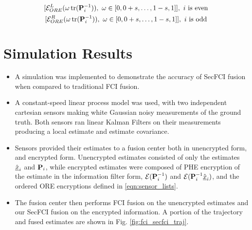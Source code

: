 \documentclass[letterpaper, 10 pt, conference]{ieeeconf}  %
\begin{document}
\begin{equation}
   \begin{gathered} \label{eqn:sensor_lists}
      [\mathcal{E}^L_{ORE}(\omega\tr(\mP^{-1}_i)),\ \omega \in [0,0+s,\dots,1-s,1]],\ i\text{ is even} \\
      [\mathcal{E}^R_{ORE}(\omega\tr(\mP^{-1}_i)),\ \omega \in [0,0+s,\dots,1-s,1]],\ i\text{ is odd}
   \end{gathered}
\end{equation}




\section{Simulation Results} \label{sec:results}
\begin{itemize}
   \item A simulation was implemented to demonstrate the accuracy of SecFCI fusion when compared to traditional FCI fusion.
   \item A constant-speed linear process model was used, with two independent cartesian sensors making white Gaussian noisy measurements of the ground truth. Both sensors ran linear Kalman Filters \cite{} on their measurements producing a local estimate and estimate covariance. 
   \item Sensors provided their estimates to a fusion center both in unencrypted form, and encrypted form. Unencrypted estimates consisted of only the estimates $\hat{{\underline{x}}}_i$ and ${{\mathbf{P}}}_i$, while encrypted estimates were composed of PHE encryption of the estimate in the information filter form, $\mathcal{E}({{\mathbf{P}}}^{-1}_i)$ and $\mathcal{E}({{\mathbf{P}}}^{-1}_i\hat{{\underline{x}}}_i)$, and the ordered ORE encryptions defined in \eqref{eqn:sensor_lists}.
   \item The fusion center then performs FCI fusion on the unencrypted estimates and our SecFCI fusion on the encrypted information. A portion of the trajectory and fused estimates are shown in Fig. \ref{fig:fci_secfci_traj}.
\end{itemize}
\end{document}
